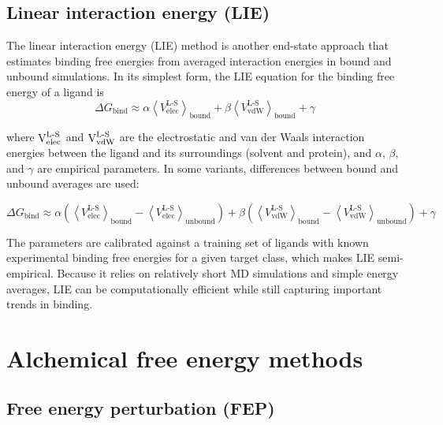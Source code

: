 \documentclass[12pt]{article}
\begin{document}
\subsection{Linear interaction energy (LIE)}

The linear interaction energy (LIE)\cite{CH10_hansson1998lie} method is another end-state approach that estimates binding free energies from averaged interaction energies in bound and unbound simulations. 
In its simplest form, the LIE equation for the binding free energy of a ligand is
\begin{equation}
\Delta G_\mathrm{bind} \approx 
\alpha \left\langle V_\mathrm{elec}^{\mathrm{L\mbox{-}S}} \right\rangle_\mathrm{bound}
+ \beta \left\langle V_\mathrm{vdW}^{\mathrm{L\mbox{-}S}} \right\rangle_\mathrm{bound}
+ \gamma
\end{equation}

where $\textrm{V}_\textrm{elec}^{\textrm{L\mbox{-}S}}$ and $\textrm{V}_\textrm{vdW}^{\textrm{L\mbox{-}S}}$ are the electrostatic and van der Waals interaction energies between the ligand and its surroundings (solvent and protein), and $\alpha$, $\beta$, and $\gamma$ are empirical parameters. 
In some variants, differences between bound and unbound averages are used:

\begin{equation}
\Delta G_\mathrm{bind} \approx 
\alpha \left( \left\langle V_\mathrm{elec}^{\mathrm{L\mbox{-}S}} \right\rangle_\mathrm{bound}
- \left\langle V_\mathrm{elec}^{\mathrm{L\mbox{-}S}} \right\rangle_\mathrm{unbound} \right)
+ \beta \left( \left\langle V_\mathrm{vdW}^{\mathrm{L\mbox{-}S}} \right\rangle_\mathrm{bound}
- \left\langle V_\mathrm{vdW}^{\mathrm{L\mbox{-}S}} \right\rangle_\mathrm{unbound} \right)
+ \gamma
\end{equation}

The parameters are calibrated against a training set of ligands with known experimental binding free energies for a given target class, which makes LIE semi-empirical. Because it relies on relatively short MD simulations and simple energy averages, LIE can be computationally efficient while still capturing important trends in binding\cite{CH10_hansson1998lie}. 


\section{Alchemical free energy methods}

\subsection{Free energy perturbation (FEP)}
\end{document}
